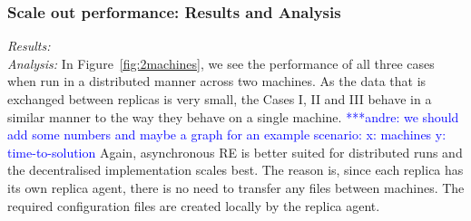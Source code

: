\documentclass{rspublic}
\newcommand{\alnote}[1]{ {\textcolor{blue} { ***andre: #1 }}}
\newcommand{\athotanote}[1]{ {\textcolor{green} { ***athota: #1 }}}
\newcommand{\alnote}[1]{}
\newcommand{\athotanote}[1]{}
\begin{document}
\subsubsection{Scale out performance: Results and Analysis}

{\it Results:}\\


{\it Analysis: } In Figure~\ref{fig:2machines}, we see the performance of all three cases when run in a distributed manner across two machines. As the data that is exchanged between replicas is very small, the Cases I, II and III behave in a similar manner to the way they behave on a single machine. \alnote{we should add some numbers and maybe a graph for an example scenario: x: machines y: time-to-solution} Again, asynchronous RE is better suited for distributed runs and the decentralised implementation scales best. The reason is, since each replica has its own replica agent, there is no need to transfer any files between machines. The required configuration files are created locally by the replica agent.


\end{document}
